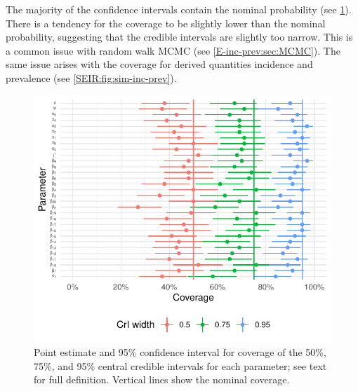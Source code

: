 \documentclass[thesis.tex]{subfiles}
\begin{document}
The majority of the confidence intervals contain the nominal probability (see \cref{SEIR:fig:sim-coverage}).
There is a tendency for the coverage to be slightly lower than the nominal probability, suggesting that the credible intervals are slightly too narrow.
This is a common issue with random walk MCMC (see \cref{E-inc-prev:sec:MCMC}).
The same issue arises with the coverage for derived quantities incidence and prevalence (see \cref{SEIR:fig:sim-inc-prev}).
\begin{figure}
    \includegraphics{SEIR/sim/coverage}
    \caption[Coverage of simulation study]{%
        Point estimate and 95\% confidence interval for coverage of the 50\%, 75\%, and 95\% central credible intervals for each parameter; see text for full definition.
        Vertical lines show the nominal coverage.
    }
    \label{SEIR:fig:sim-coverage}
\end{figure}
\end{document}
